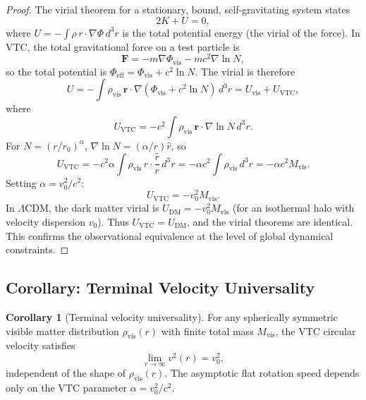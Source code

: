 \documentclass[11pt,a4paper]{article}
\theoremstyle{definition}
\newtheorem{corollary}[theorem]{Corollary}
\newcommand{\vis}{\mathrm{vis}}
\newcommand{\eff}{\mathrm{eff}}
\newcommand{\DM}{\mathrm{DM}}
\newcommand{\VTC}{\mathrm{VTC}}
\begin{document}
\begin{proof}
The virial theorem for a stationary, bound, self-gravitating system states
\begin{equation}
2K + U = 0,
\end{equation}
where $U = -\int \rho\,r\cdot\nabla\Phi\,d^3r$ is the total potential energy (the virial of the force). In VTC, the total gravitational force on a test particle is
\begin{equation}
\mathbf{F} = -m\nabla\Phi_{\vis} - mc^2\nabla\ln N,
\end{equation}
so the total potential is $\Phi_{\eff} = \Phi_{\vis} + c^2\ln N$. The virial is therefore
\begin{equation}
U = -\int \rho_{\vis}\,\mathbf{r}\cdot\nabla(\Phi_{\vis} + c^2\ln N)\,d^3r = U_{\vis} + U_{\VTC},
\end{equation}
where
\begin{equation}
U_{\VTC} = -c^2\int \rho_{\vis}\,\mathbf{r}\cdot\nabla\ln N\,d^3r.
\end{equation}
For $N = (r/r_0)^\alpha$, $\nabla\ln N = (\alpha/r)\hat{r}$, so
\begin{equation}
U_{\VTC} = -c^2\alpha\int \rho_{\vis}\,r\cdot\frac{\hat{r}}{r}\,d^3r = -\alpha c^2\int \rho_{\vis}\,d^3r = -\alpha c^2 M_{\vis}.
\end{equation}
Setting $\alpha = v_0^2/c^2$:
\begin{equation}
\boxed{U_{\VTC} = -v_0^2 M_{\vis}.}
\end{equation}
In $\Lambda$CDM, the dark matter virial is $U_{\DM} = -v_0^2 M_{\vis}$ (for an isothermal halo with velocity dispersion $v_0$). Thus $U_{\VTC} = U_{\DM}$, and the virial theorems are identical. This confirms the observational equivalence at the level of global dynamical constraints.
\end{proof}

\subsection{Corollary: Terminal Velocity Universality}
\label{cor:terminal}

\begin{corollary}[Terminal velocity universality]
For any spherically symmetric visible matter distribution $\rho_{\vis}(r)$ with finite total mass $M_{\vis}$, the VTC circular velocity satisfies
\begin{equation}
\lim_{r\to\infty} v^2(r) = v_0^2,
\end{equation}
independent of the shape of $\rho_{\vis}(r)$. The asymptotic flat rotation speed depends only on the VTC parameter $\alpha = v_0^2/c^2$.
\end{corollary}
\end{document}
